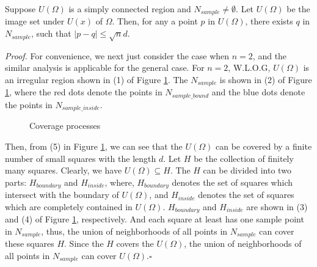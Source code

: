 \begin{mythm}\label{thm4}
	Suppose $U(\Omega )$ is a simply connected region and ${N_{sample}} \ne \emptyset $. Let $U(\Omega )$ be the image set under $U(x)$ of $\Omega$. Then, for any a point $p$ in $U(\Omega)$, there exists $q$ in ${N_{sample}}$, such that $|p - q| \le \sqrt n d$.
\end{mythm}
\emph{Proof.}
For convenience, we next just consider the case when $n=2$, and the similar analysis is applicable for the general case. For $n = 2$, W.L.O.G, $U(\Omega )$ is an irregular region shown in (1) of Figure \ref{proof}. The $N_{sample}$ is shown in (2) of Figure \ref{proof}, where the red dots denote the points in ${N_{sample\_bound}}$ and the blue dots denote the points in ${N_{sample\_inside}}$.
\begin{figure}[htb] 
	\caption{\label{proof}Coverage processes}
\end{figure}
Then, from (5) in Figure \ref{proof}, we can see that the $U(\Omega )$ can be covered by a finite number of small squares with the length $d$. Let $H$ be the collection of finitely many squares. Clearly, we have $U(\Omega ) \subseteq H$.  The $H$ can be divided into two parts: $H_{boundary}$ and $H_{inside}$, where, $H_{boundary}$ denotes the set of squares which intersect with the boundary of $U(\Omega)$, and $H_{inside}$ denotes the set of squares which are completely contained in $U(\Omega)$. $H_{boundary}$ and $H_{inside}$ are shown in (3) and (4) of Figure \ref{proof}, respectively. And each square at least has one sample point in $N_{sample}$, thus, the union of neighborhoods of all points in ${N_{sample}}$ can cover these squares $H$. Since the $H$ covers the $U(\Omega )$, the union of neighborhoods of all points in ${N_{sample}}$ can cover $U(\Omega )$.$\square$

